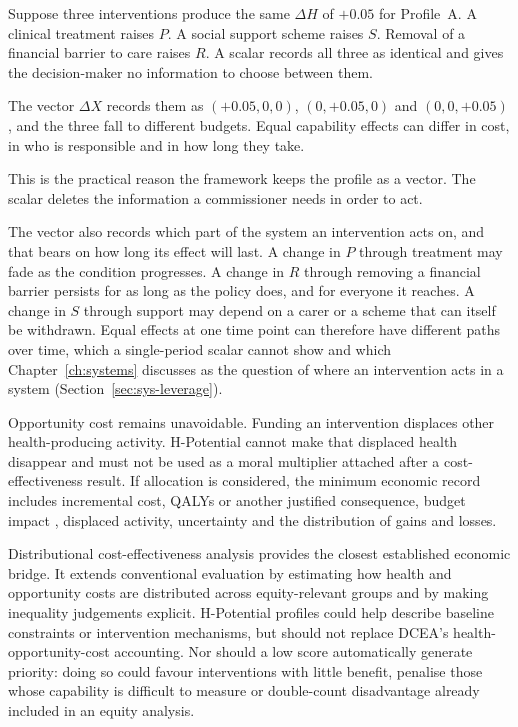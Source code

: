\begin{reading}
Suppose three interventions produce the same $\Delta H$ of $+0.05$ for
Profile~A. A clinical treatment raises $P$. A social support scheme raises $S$.
Removal of a financial barrier to care raises $R$. A scalar records all three
as identical and gives the decision-maker no information to choose between
them.

The vector $\Delta X$ records them as $(+0.05,0,0)$, $(0,+0.05,0)$ and
$(0,0,+0.05)$, and the three fall to different budgets. Equal capability
effects can differ in cost, in who is responsible and in how long they take.

This is the practical reason the framework keeps the profile as a vector. The
scalar deletes the information a commissioner needs in order to act.
\end{reading}

The vector also records which part of the system an intervention acts on, and
that bears on how long its effect will last. A change in $P$ through
treatment may fade as the condition progresses. A change in $R$ through
removing a financial barrier persists for as long as the policy does, and for
everyone it reaches. A change in $S$ through support may depend on a carer or a
scheme that can itself be withdrawn. Equal effects at one time point can
therefore have different paths over time, which a single-period scalar cannot
show and which Chapter~\ref{ch:systems} discusses as the question of where an
intervention acts in a system (Section~\ref{sec:sys-leverage}).

Opportunity cost remains unavoidable. Funding an intervention displaces other
health-producing activity. H-Potential cannot make that displaced health
disappear and must not be used as a moral multiplier attached after a
cost-effectiveness result. If allocation is considered, the minimum economic
record includes incremental cost, QALYs or another justified consequence,
budget impact \citep{sullivan_2014}, displaced activity, uncertainty and the distribution of gains
and losses.

Distributional cost-effectiveness analysis provides the closest established
economic bridge. It extends conventional evaluation by estimating how health
and opportunity costs are distributed across equity-relevant groups and by
making inequality judgements explicit. \citep{asaria_2016_dcea} H-Potential
profiles could help describe baseline constraints or intervention mechanisms,
but should not replace DCEA's health-opportunity-cost accounting. Nor should a
low score automatically generate priority: doing so could favour interventions
with little benefit, penalise those whose capability is difficult to measure or
double-count disadvantage already included in an equity analysis.

